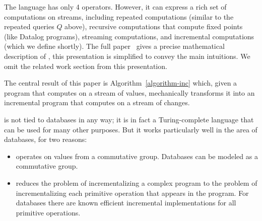 
The \dbsp language has only 4 operators.  However, it can express a
rich set of computations on streams, including repeated computations
(similar to the repeated queries $Q$ above), recursive computations
that compute fixed points (like Datalog programs), streaming
computations, and incremental computations (which we define shortly).
The full paper~\cite{budiu-vldb23} gives a precise mathematical
description of \dbsp, this presentation is simplified to convey the
main intuitions.  We omit the related work section from this
presentation.

The central result of this paper is Algorithm~\ref{algorithm-inc}
which, given a \dbsp program that computes on a stream of values,
mechanically transforms it into an incremental \dbsp program that
computes on a stream of changes.

\dbsp is not tied to databases in any way; it is in fact a
Turing-complete language that can be used for many other purposes.
But it works particularly well in the area of databases, for two
reasons:

\begin{itemize}[nosep, leftmargin=0pt, itemindent=0.5cm]
  \item \dbsp operates on values from a commutative group.  Databases
    can be modeled as a commutative group.
  \item \dbsp reduces the problem of incrementalizing a complex
    program to the problem of incrementalizing each primitive
    operation that appears in the program.  For databases there are
    known efficient incremental implementations for all primitive
    operations.
\end{itemize}

